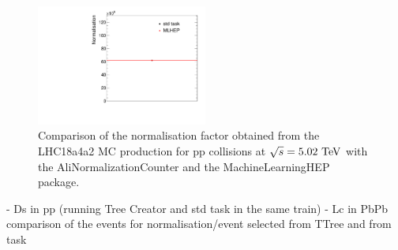  \begin{figure}[tb]
\begin{center}
\includegraphics[width=0.5\textwidth]{figures/NormComparison.pdf}
\caption{Comparison of the normalisation factor obtained from the LHC18a4a2 MC production for pp collisions at $\sqrt{s}=5.02~\mathrm{TeV}$ with the AliNormalizationCounter and the MachineLearningHEP package.}
\label{fig:NormalisationComparisonMCpp} 
\end{center}
\end{figure}

- Ds in pp (running Tree Creator and std task in the same train)
- Lc in PbPb comparison of the events for normalisation/event selected from TTree and from task
